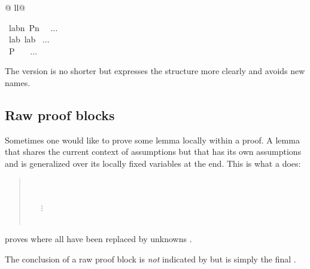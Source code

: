 \begin{isabellebody}
\begin{tabular}{@ {}ll@ {}}
\begin{minipage}[t]{.4\textwidth}
{\isamarkupfalse%
\ lab\isactrlisub n{}\ {}P\isactrlisub n{}\ %
\ $\dots$\\
\isamarkupfalse%
\ lab\ lab%
\ $\dots$\\
\isamarkupfalse%
\ {}P{}\ \ %
\ $\dots$\\
%
\endisatagproof
{\isafoldproof}%
%
\isadelimproof
%
\endisadelimproof
%
}
\end{minipage}
\end{tabular}
\begin{isamarkuptext}%
The  version is no shorter but expresses the structure more
clearly and avoids new names.

\subsection{Raw proof blocks}

Sometimes one would like to prove some lemma locally within a proof.
A lemma that shares the current context of assumptions but that
has its own assumptions and is generalized over its locally fixed
variables at the end. This is what a  does:
\begin{quote}
  \\
\mbox{}\ \ \  \\
\mbox{}\ \ \ $\vdots$\\
\mbox{}\ \ \  \\
\end{quote}
proves 
where all  have been replaced by unknowns .
\begin{warn}
The conclusion of a raw proof block is \emph{not} indicated by 
but is simply the final .
\end{warn}


\end{isamarkuptext}
\end{isabellebody}
